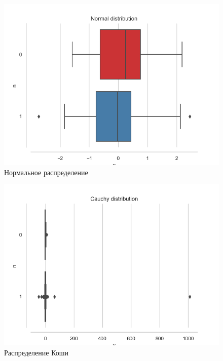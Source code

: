 \documentclass[../main.tex]{subfiles}
\begin{document}
	\begin{figure}[H]
        \centering
        \includegraphics[scale=0.8]{figures/NormalBoxplot.png}
        \caption{Нормальное распределение}
        \label{fig:normal}
    \end{figure}
    
    \begin{figure}[H]
        \centering
        \includegraphics[scale=0.8]{figures/CauchyBoxplot.png}
        \caption{Распределение Коши}
        \label{fig:normal}
    \end{figure}
    
\end{document}
